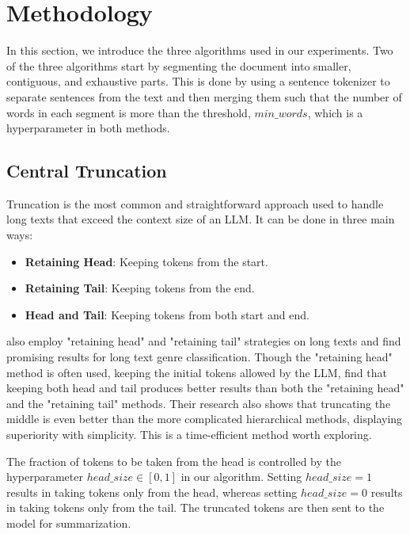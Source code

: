 \section{Methodology}
\label{sec:methodology}

In this section, we introduce the three algorithms used in our experiments.
Two of the three algorithms start by segmenting the document into smaller, contiguous, and exhaustive parts.
This is done by using a sentence tokenizer to separate sentences from the text and then merging them such that the number of words in each segment is more than the threshold, $min\_words$, which is a hyperparameter in both methods.


\subsection{Central Truncation}
\label{method:truncation}

Truncation is the most common and straightforward approach used to handle long texts that exceed the context size of an LLM.
It can be done in three main ways:

\begin{itemize}
  \item \textbf{Retaining Head}: Keeping tokens from the start.
  \item \textbf{Retaining Tail}: Keeping tokens from the end.
  \item \textbf{Head and Tail}: Keeping tokens from both start and end.
\end{itemize}

\citet{worsham-kalita-2018-genre} also employ "retaining head" and "retaining tail" strategies on long texts and find promising results for long text genre classification.
Though the "retaining head" method is often used, keeping the initial tokens allowed by the LLM, \citet{sun2019fine} find that keeping both head and tail produces better results than both the "retaining head" and the "retaining tail" methods.
Their research also shows that truncating the middle is even better than the more complicated hierarchical methods, displaying superiority with simplicity.
This is a time-efficient method worth exploring.

The fraction of tokens to be taken from the head is controlled by the hyperparameter $head\_size \in [0, 1]$ in our algorithm.
Setting $head\_size = 1$ results in taking tokens only from the head, whereas setting $head\_size = 0$ results in taking tokens only from the tail.
The truncated tokens are then sent to the model for summarization.


